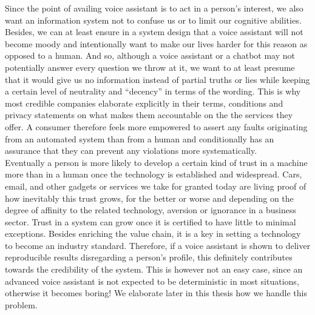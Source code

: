 Since the point of availing voice assistant is to act in a person's interest, we also want an information system not to confuse us or to limit our cognitive abilities.
Besides, we can at least ensure in a system design that a voice assistant will not become moody and intentionally want to make our lives harder for this reason as opposed to a human.
And so, although a voice assistant or a chatbot may not potentially answer every question we throw at it, we want to at least presume that it would give us no information instead of partial truths or lies while keeping a certain level of neutrality and ``decency'' in terms of the wording.
This is why most credible companies elaborate explicitly in their terms, conditions and privacy statements on what makes them accountable on the %
the services they offer.
A consumer therefore feels more empowered to assert any faults originating from an automated system than from a human and conditionally has an assurance that they can prevent any violations more systematically.\\

Eventually a person is more likely to develop a certain kind of trust in a machine more than in a human once the technology is established and widespread.
Cars, email, and other gadgets or services we take for granted today are living proof of how inevitably this trust grows, for the better or worse and depending on the degree of affinity to the related technology, aversion or ignorance in a business sector.
Trust in a system can grow once it is certified to have little to minimal exceptions. Besides enriching the value chain, it is a key in setting a technology to become an industry standard.
Therefore, if a voice assistant is shown to deliver reproducible results disregarding a person's profile, this definitely contributes towards the credibility of the system.
This is however not an easy case, since an advanced voice assistant is not expected to be deterministic in most situations, otherwise it becomes boring! We elaborate later in this thesis how %
we handle this problem.\\

